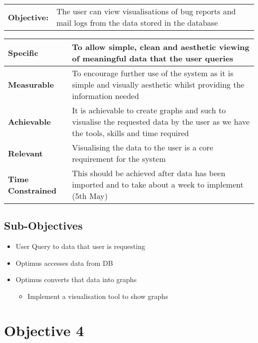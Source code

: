 \begin{table}[H]
    \begin{tabularx}{\textwidth}{| l | X |}
        \hline
        \textbf{Objective:} & The user can view visualisations of bug reports and mail logs from the data stored in the database \\
    \end{tabularx}
    \begin{tabularx}{\textwidth}{| l | X |}
        \hline
        \textbf{Specific} & To allow simple, clean and aesthetic viewing of meaningful data that the user queries\\ \hline
        \textbf{Measurable} & To encourage further use of the system as it is simple and visually aesthetic whilst providing the information needed\\ \hline
        \textbf{Achievable} &  It is achievable to create graphs and such to visualise the requested data by the user as we have the tools, skills and time required\\ \hline
        \textbf{Relevant} & Visualising the data to the user is a core requirement for the system  \\ \hline
        \textbf{Time Constrained} & This should be achieved after data has been imported and to take about a week to implement (5th May) \\ \hline
    \end{tabularx}
\end{table}

\subsection{Sub-Objectives}
	\begin{itemize}
		\item User Query to data that user is requesting
		\item Optimus accesses data from DB
		\item Optimus converts that data into graphs
	\begin{itemize}
		\item Implement a visualisation tool to show graphs
	\end{itemize}
	\end{itemize}


\section{Objective 4}

